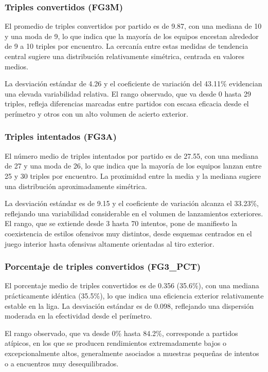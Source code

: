 \documentclass[12pt]{article}
\begin{document}
\subsubsection*{Triples convertidos (FG3M)}

El promedio de triples convertidos por partido es de 9.87, con una mediana de 10 y una moda de 9,
lo que indica que la mayoría de los equipos encestan alrededor de 9 a 10 triples por encuentro.
La cercanía entre estas medidas de tendencia central sugiere una distribución relativamente
simétrica, centrada en valores medios.

La desviación estándar de 4.26 y el coeficiente de variación del 43.11\% evidencian una elevada
variabilidad relativa. El rango observado, que va desde 0 hasta 29 triples, refleja diferencias
marcadas entre partidos con escasa eficacia desde el perímetro y otros con un alto volumen de
acierto exterior.

\subsubsection*{Triples intentados (FG3A)}

El número medio de triples intentados por partido es de 27.55, con una mediana de 27 y una moda
de 26, lo que indica que la mayoría de los equipos lanzan entre 25 y 30 triples por encuentro.
La proximidad entre la media y la mediana sugiere una distribución aproximadamente simétrica.

La desviación estándar es de 9.15 y el coeficiente de variación alcanza el 33.23\%, reflejando una
variabilidad considerable en el volumen de lanzamientos exteriores. El rango, que se extiende
desde 3 hasta 70 intentos, pone de manifiesto la coexistencia de estilos ofensivos muy distintos,
desde esquemas centrados en el juego interior hasta ofensivas altamente orientadas al tiro
exterior.

\subsubsection*{Porcentaje de triples convertidos (FG3\_PCT)}

El porcentaje medio de triples convertidos es de 0.356 (35.6\%), con una mediana prácticamente
idéntica (35.5\%), lo que indica una eficiencia exterior relativamente estable en la liga. La
desviación estándar es de 0.098, reflejando una dispersión moderada en la efectividad desde el
perímetro.

El rango observado, que va desde 0\% hasta 84.2\%, corresponde a partidos atípicos, en los que se
producen rendimientos extremadamente bajos o excepcionalmente altos, generalmente asociados a
muestras pequeñas de intentos o a encuentros muy desequilibrados.
\end{document}
